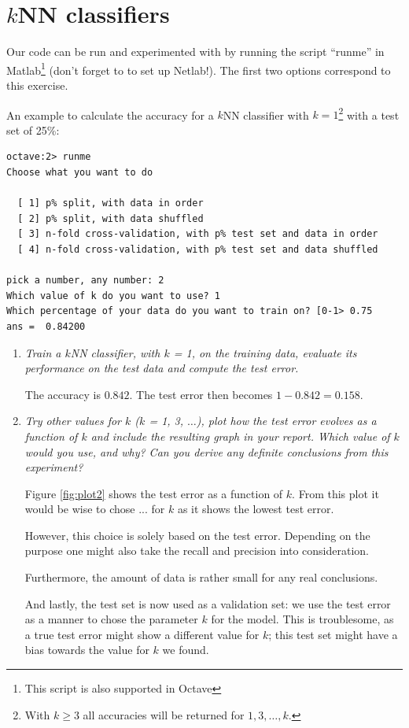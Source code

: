 \documentclass[a4paper,11pt]{article}
\begin{document}


\section{$k$NN classifiers}
\label{sec:two}
Our code can be run and experimented with by running the script ``runme'' 
in Matlab\footnote{This script is also supported in Octave} (don't forget to
to set up Netlab!). 
The first two options correspond to this exercise. 

An example to calculate the accuracy for a $k$NN classifier with $k = 1$\footnote{With $k \ge 3$ all accuracies will be returned for $1, 3, \ldots, k$.}
with a test set of 25\%: 
\begin{verbatim}
octave:2> runme
Choose what you want to do

  [ 1] p% split, with data in order
  [ 2] p% split, with data shuffled
  [ 3] n-fold cross-validation, with p% test set and data in order
  [ 4] n-fold cross-validation, with p% test set and data shuffled

pick a number, any number: 2
Which value of k do you want to use? 1
Which percentage of your data do you want to train on? [0-1> 0.75
ans =  0.84200
\end{verbatim}

\begin{enumerate}
\item \textit{Train a $k$NN classifier, with $k$ = 1, on the training data, evaluate its performance on the test data and
compute the test error.}

The accuracy is $0.842$. The test error then becomes $1 - 0.842 = 0.158$. 

\item \textit{Try other values for $k$ ($k$ = 1, 3, $\ldots$), plot how the test error evolves as a function of $k$ and include the
resulting graph in your report. Which value of $k$ would you use, and why? Can you derive any definite
conclusions from this experiment?
}

Figure \ref{fig:plot2} shows the test error as a function of $k$. From this
plot it would be wise to chose ... for $k$ as it shows the lowest test error. 

However, this choice is solely based on the test error. Depending on the 
purpose one might also take the recall and precision into consideration. 

Furthermore, the amount of data is rather small for any real conclusions.

And lastly, the test set is now used as a validation set: we use the test 
error as a manner to chose the parameter $k$ for the model. 
This is troublesome, as a true test error might show a different value for 
$k$; this test set might have a bias towards the value for $k$ we found.


\end{enumerate}
\end{document}
